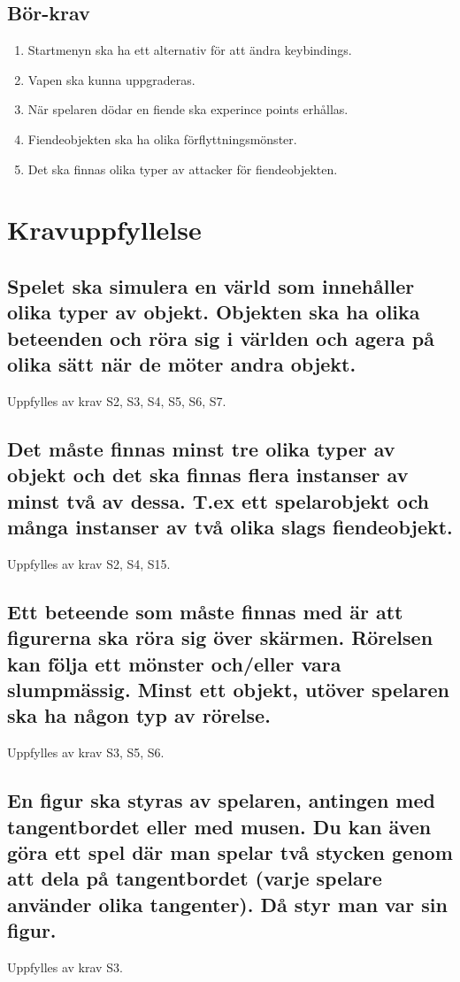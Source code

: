 \documentclass{TDP005mall}
\begin{document}
\subsection{Bör-krav}
\begin{enumerate}[label=B\arabic*]
\item Startmenyn ska ha ett alternativ för att ändra keybindings.
\item Vapen ska kunna uppgraderas.
\item När spelaren dödar en fiende ska experince points erhållas.
\item Fiendeobjekten ska ha olika förflyttningsmönster.
\item Det ska finnas olika typer av attacker för fiendeobjekten.
\end{enumerate}

\section{Kravuppfyllelse}

\subsection{Spelet ska simulera en värld som innehåller olika typer av objekt. Objekten ska ha olika beteenden och röra sig i världen och agera på olika sätt när de möter andra objekt.}
Uppfylles av krav S2, S3, S4, S5, S6, S7.
\subsection{Det måste finnas minst tre olika typer av objekt och det ska finnas flera instanser av minst två av dessa. T.ex ett spelarobjekt och många instanser av två olika slags fiendeobjekt.}
Uppfylles av krav S2, S4, S15.
\subsection{Ett beteende som måste finnas med är att figurerna ska röra sig över skärmen. Rörelsen kan följa ett mönster och/eller vara slumpmässig. Minst ett objekt, utöver spelaren ska ha någon typ av rörelse.}
Uppfylles av krav S3, S5, S6. 
\subsection{En figur ska styras av spelaren, antingen med tangentbordet eller med musen. Du kan även göra ett spel där man spelar två stycken genom att dela på tangentbordet (varje spelare använder olika tangenter). Då styr man var sin figur.}
Uppfylles av krav S3.
\end{document}
